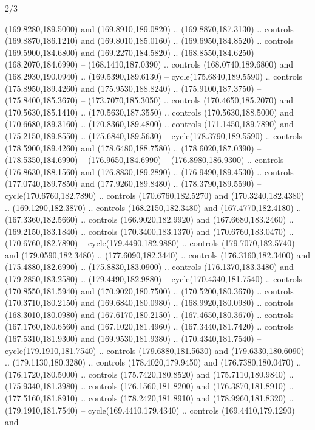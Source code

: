 \begin{flagdescription}{2/3}
\begin{scope}[xshift=0.5\flaglength,yshift=0.5\flagwidth,scale=\stretchfactor]
\begin{scope}[scale=0.001645\flagwidth,yshift=65mm,xshift=-63mm]
\begin{scope}[y=0.80pt, x=0.80pt, yscale=-1,]
\begin{scope}[cm={{1.33333,0.0,0.0,1.33333,(0.0,1e-05)}}]
  (169.8280,189.5000) and (169.8910,189.0820) .. (169.8870,187.3130) .. controls
  (169.8870,186.1210) and (169.8010,185.0160) .. (169.6950,184.8520) .. controls
  (169.5900,184.6800) and (169.2270,184.5820) .. (168.8550,184.6250) --
  (168.2070,184.6990) -- (168.1410,187.0390) .. controls (168.0740,189.6800) and
  (168.2930,190.0940) .. (169.5390,189.6130) -- cycle(175.6840,189.5590) ..
  controls (175.8950,189.4260) and (175.9530,188.8240) .. (175.9100,187.3750) --
  (175.8400,185.3670) -- (173.7070,185.3050) .. controls (170.4650,185.2070) and
  (170.5630,185.1410) .. (170.5630,187.3550) .. controls (170.5630,188.5000) and
  (170.6680,189.3160) .. (170.8360,189.4800) .. controls (171.1450,189.7890) and
  (175.2150,189.8550) .. (175.6840,189.5630) -- cycle(178.3790,189.5590) ..
  controls (178.5900,189.4260) and (178.6480,188.7580) .. (178.6020,187.0390) --
  (178.5350,184.6990) -- (176.9650,184.6990) -- (176.8980,186.9300) .. controls
  (176.8630,188.1560) and (176.8830,189.2890) .. (176.9490,189.4530) .. controls
  (177.0740,189.7850) and (177.9260,189.8480) .. (178.3790,189.5590) --
  cycle(170.6760,182.7890) .. controls (170.6760,182.5270) and
  (170.3240,182.4380) .. (169.1290,182.3870) .. controls (168.2150,182.3480) and
  (167.4770,182.4180) .. (167.3360,182.5660) .. controls (166.9020,182.9920) and
  (167.6680,183.2460) .. (169.2150,183.1840) .. controls (170.3400,183.1370) and
  (170.6760,183.0470) .. (170.6760,182.7890) -- cycle(179.4490,182.9880) ..
  controls (179.7070,182.5740) and (179.0590,182.3480) .. (177.6090,182.3440) ..
  controls (176.3160,182.3400) and (175.4880,182.6990) .. (175.8830,183.0900) ..
  controls (176.1370,183.3480) and (179.2850,183.2580) .. (179.4490,182.9880) --
  cycle(170.4340,181.7540) .. controls (170.8550,181.5940) and
  (170.9020,180.7500) .. (170.5200,180.3670) .. controls (170.3710,180.2150) and
  (169.6840,180.0980) .. (168.9920,180.0980) .. controls (168.3010,180.0980) and
  (167.6170,180.2150) .. (167.4650,180.3670) .. controls (167.1760,180.6560) and
  (167.1020,181.4960) .. (167.3440,181.7420) .. controls (167.5310,181.9300) and
  (169.9530,181.9380) .. (170.4340,181.7540) -- cycle(179.1910,181.7540) ..
  controls (179.6880,181.5630) and (179.6330,180.6090) .. (179.1130,180.3280) ..
  controls (178.4020,179.9450) and (176.7380,180.0470) .. (176.1720,180.5000) ..
  controls (175.7420,180.8520) and (175.7110,180.9840) .. (175.9340,181.3980) ..
  controls (176.1560,181.8200) and (176.3870,181.8910) .. (177.5160,181.8910) ..
  controls (178.2420,181.8910) and (178.9960,181.8320) .. (179.1910,181.7540) --
  cycle(169.4410,179.4340) .. controls (169.4410,179.1290) and

\end{scope}
\end{scope}
\end{scope}
\end{scope}
\end{flagdescription}
